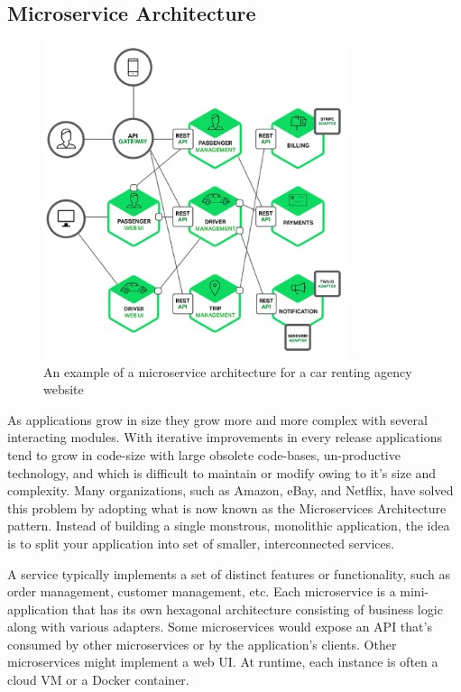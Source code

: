 \subsection{Microservice Architecture}

\begin{figure}[!ht]
	\begin{center}
		\includegraphics[width=0.8\textwidth]{guided/figs/microservice.pdf}
		\caption{An example of a microservice architecture for a car renting agency website}
		\label{fig:microservice}
	\end{center}
\end{figure}

As applications grow in size they grow more and more complex with several interacting modules. 
With iterative improvements in every release applications tend to grow in code-size with large obsolete code-bases, un-productive technology, and which is difficult to maintain or modify owing to it's size and complexity.
Many organizations, such as Amazon, eBay, and Netflix, have solved this problem by adopting what is now known as the Microservices Architecture pattern. Instead of building a single monstrous, monolithic application, the idea is to split your application into set of smaller, interconnected services.

A service typically implements a set of distinct features or functionality, such as order management, customer management, etc. Each microservice is a mini-application that has its own hexagonal architecture consisting of business logic along with various adapters. Some microservices would expose an API that’s consumed by other microservices or by the application’s clients. Other microservices might implement a web UI. At runtime, each instance is often a cloud VM or a Docker container.


